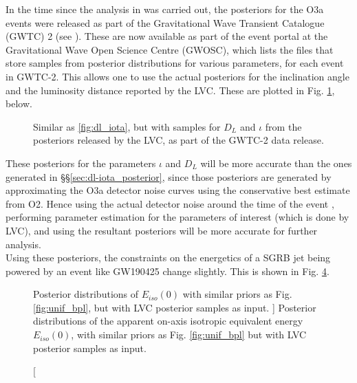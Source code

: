     In the time since the analysis in \cite{saleem_2020B} was carried out, the
    posteriors for the O3a events were released as part of the Gravitational Wave
    Transient Catalogue (GWTC) 2 (see \cite{abbott_2020A}). These are now available as
    part of the event portal at the Gravitational Wave Open Science Centre (GWOSC),
    which lists the files that store samples from posterior distributions for various
    parameters, for each event in GWTC-2. This allows one to use the actual posteriors
    for the inclination angle and the luminosity distance reported by the LVC. These are
    plotted in Fig. \ref{fig:dl-iota_post_updated}, below.\\

    \begin{figure}[H]
        \centering
        \def\svgwidth{\textwidth}
        
        \caption[$D_L-\iota$ posterior, with samples from the data released by LVC.]
        {
            Similar as \ref{fig:dl_iota}, but with samples for $D_L$ and $\iota$ from
            the posteriors released by the LVC, as part of the GWTC-2 data release.
        }
        \label{fig:dl-iota_post_updated}
    \end{figure}

    These posteriors for the parameters $\iota$ and $D_L$ will be more accurate than the
    ones generated in \S\S\ref{sec:dl-iota_posterior}, since those posteriors are
    generated by approximating the O3a detector noise curves using the conservative best
    estimate from O2. Hence using the actual detector noise around the time of the event
    , performing parameter estimation for the parameters of interest (which is done by
    LVC), and using the resultant posteriors will be more accurate for further
    analysis.\\
    Using these posteriors, the constraints on the energetics of a SGRB jet
    being powered by an event like GW190425 change slightly. This is shown in Fig.
    \ref{fig:unif_bpl_updated}.

    \begin{figure}[H]
        \begin{subfigure}{0.5\textwidth}
              \label{fig:unif_updated}
              \centering
              \def\svgwidth{\textwidth}
              
        \end{subfigure}%
        \begin{subfigure}{0.5\textwidth}
              \label{fig:bpl_updated}
              \centering
              \def\svgwidth{\textwidth}
              
        \end{subfigure}
        \caption
        [
            Posterior distributions of $E_{iso}(0)$ with similar priors as Fig.
            \ref{fig:unif_bpl}, but with LVC posterior samples as input.
        ]
        {
            Posterior distributions of the apparent on-axis isotropic equivalent energy
            $E_{iso}(0)$, with similar priors as Fig. \ref{fig:unif_bpl} but with LVC
            posterior samples as input.
        }
        \label{fig:unif_bpl_updated}
    \end{figure}

